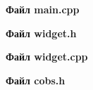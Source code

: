 \documentclass[14pt,a4paper]{extreport}
\begin{document}
\textbf{Файл main.cpp}
\begin{alltt}
    
\end{alltt}

\textbf{Файл widget.h}
\begin{alltt}
    
\end{alltt}

\textbf{Файл widget.cpp}
\begin{alltt}
    
\end{alltt}

\textbf{Файл cobs.h}
\begin{alltt}
    
\end{alltt}
\end{document}
